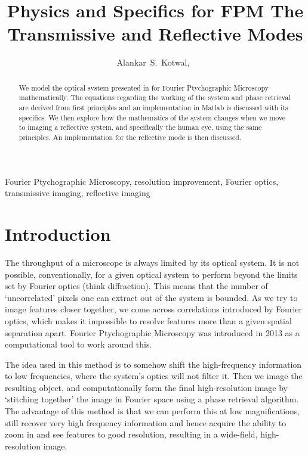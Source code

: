 \documentclass[11pt,a4paper,journal]{IEEEtran}
\title{Physics and Specifics for FPM \linebreak The Transmissive and Reflective Modes}
\author{Alankar~S.~Kotwal,~\IEEEmembership{Indian Institute of Technology Bombay}}
\begin{document}
\maketitle

\begin{abstract}
We model the optical system presented in \cite{FPMPaper} for Fourier Ptychographic Microscopy mathematically. The equations regarding the working of the system and phase retrieval are derived from first principles and an implementation in Matlab is discussed with its specifics. We then explore how the mathematics of the system changes when we move to imaging a reflective system, and specifically the human eye, using the same principles. An implementation for the reflective mode is then discussed.
\end{abstract}

\begin{keywords}
Fourier Ptychographic Microscopy, resolution improvement, Fourier optics, transmissive imaging, reflective imaging
\end{keywords}

\section{Introduction}
The throughput of a microscope is always limited by its optical system. It is not possible, conventionally, for a given optical system to perform beyond the limits set by Fourier optics (think diffraction). This means that the number of `uncorrelated' pixels one can extract out of the system is bounded. As we try to image features closer together, we come across correlations introduced by Fourier optics, which makes it impossible to resolve features more than a given spatial separation apart. Fourier Ptychographic Microscopy was introduced in 2013 as a computational tool to work around this.

The idea used in this method is to somehow shift the high-frequency information to low frequencies, where the system's optics will not filter it. Then we image the resulting object, and computationally form the final high-resolution image by `stitching together' the image in Fourier space using a phase retrieval algorithm. The advantage of this method is that we can perform this at low magnifications, still recover very high frequency information and hence acquire the ability to zoom in and see features to good resolution, resulting in a wide-field, high-resolution image.
\end{document}
